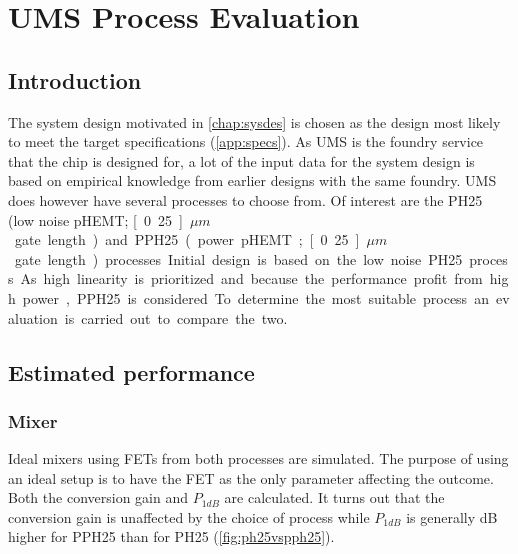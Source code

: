 \chapter{UMS Process Evaluation}\label{sec:processval}
	\section{Introduction}
		The system design motivated in \autoref{chap:sysdes} is chosen as the design most likely to meet the target specifications (\autoref{app:specs}). As UMS is the foundry service that the chip is designed for, a lot of the input data for the system design is based on empirical knowledge from earlier designs with the same foundry. UMS does however have several processes to choose from. Of interest are the PH25 (low noise pHEMT; \unit[0.25]{$\mu m$} gate length) and PPH25 (power pHEMT; \unit[0.25]{$\mu m$} gate length) processes.

		Initial design is based on the low noise PH25 process. As high linearity is prioritized and because the performance profit from high power, PPH25 is considered. To determine the most suitable process an evaluation is carried out to compare the two.

	\section{Estimated performance}
	
		\subsection{Mixer}
			Ideal mixers using FETs from both processes are simulated. The purpose of using an ideal setup is to have the FET as the only parameter affecting the outcome. Both the conversion gain and $P_{1dB}$ are calculated. It turns out that the conversion gain is unaffected by the choice of process while $P_{1dB}$ is generally \unit[1]{dB} higher for PPH25 than for PH25 (\autoref{fig:ph25vspph25}).

